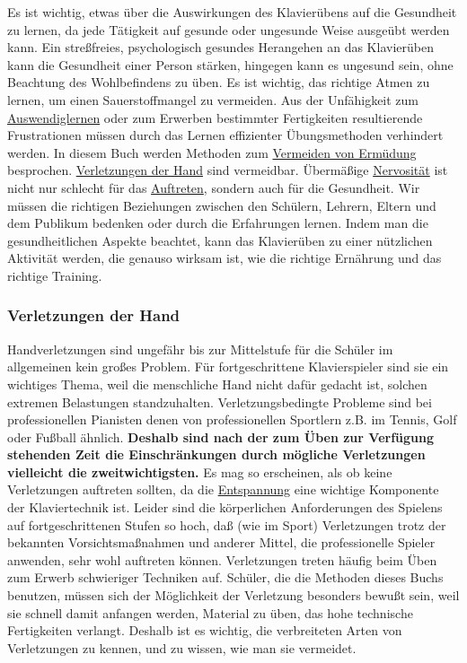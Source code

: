 Es ist wichtig, etwas über die Auswirkungen des Klavierübens auf die Gesundheit zu lernen, da jede Tätigkeit auf gesunde oder ungesunde Weise ausgeübt werden kann.
Ein streßfreies, psychologisch gesundes Herangehen an das Klavierüben kann die Gesundheit einer Person stärken, hingegen kann es ungesund sein, ohne Beachtung des Wohlbefindens zu üben.
Es ist wichtig, das richtige Atmen zu lernen, um einen Sauerstoffmangel zu vermeiden.
Aus der Unfähigkeit zum \hyperref[c1iii6]{Auswendiglernen} oder zum Erwerben bestimmter Fertigkeiten resultierende Frustrationen müssen durch das Lernen effizienter Übungsmethoden verhindert werden.
In diesem Buch werden Methoden zum \hyperref[c1ii14]{Vermeiden von Ermüdung} besprochen.
\hyperref[c1iii10hand]{Verletzungen der Hand} sind vermeidbar.
Übermäßige \hyperref[c1iii15]{Nervosität} ist nicht nur schlecht für das \hyperref[c1iii14]{Auftreten}, sondern auch für die Gesundheit.
Wir müssen die richtigen Beziehungen zwischen den Schülern, Lehrern, Eltern und dem Publikum bedenken oder durch die Erfahrungen lernen.
Indem man die gesundheitlichen Aspekte beachtet, kann das Klavierüben zu einer nützlichen Aktivität werden, die genauso wirksam ist, wie die richtige Ernährung und das richtige Training.


\subsubsection{Verletzungen der Hand}
\label{c1iii10hand}

Handverletzungen sind ungefähr bis zur Mittelstufe für die Schüler im allgemeinen kein großes Problem.
Für fortgeschrittene Klavierspieler sind sie ein wichtiges Thema, weil die menschliche Hand nicht dafür gedacht ist, solchen extremen Belastungen standzuhalten.
Verletzungsbedingte Probleme sind bei professionellen Pianisten denen von professionellen Sportlern z.B. im Tennis, Golf oder Fußball ähnlich.
\textbf{Deshalb sind nach der zum Üben zur Verfügung stehenden Zeit die Einschränkungen durch mögliche Verletzungen vielleicht die zweitwichtigsten.}
Es mag so erscheinen, als ob keine Verletzungen auftreten sollten, da die \hyperref[c1ii14]{Entspannung} eine wichtige Komponente der Klaviertechnik ist.
Leider sind die körperlichen Anforderungen des Spielens auf fortgeschrittenen Stufen so hoch, daß (wie im Sport) Verletzungen trotz der bekannten Vorsichtsmaßnahmen und anderer Mittel, die professionelle Spieler anwenden, sehr wohl auftreten können.
Verletzungen treten häufig beim Üben zum Erwerb schwieriger Techniken auf.
Schüler, die die Methoden dieses Buchs benutzen, müssen sich der Möglichkeit der Verletzung besonders bewußt sein, weil sie schnell damit anfangen werden, Material zu üben, das hohe technische Fertigkeiten verlangt.
Deshalb ist es wichtig, die verbreiteten Arten von Verletzungen zu kennen, und zu wissen, wie man sie vermeidet.

